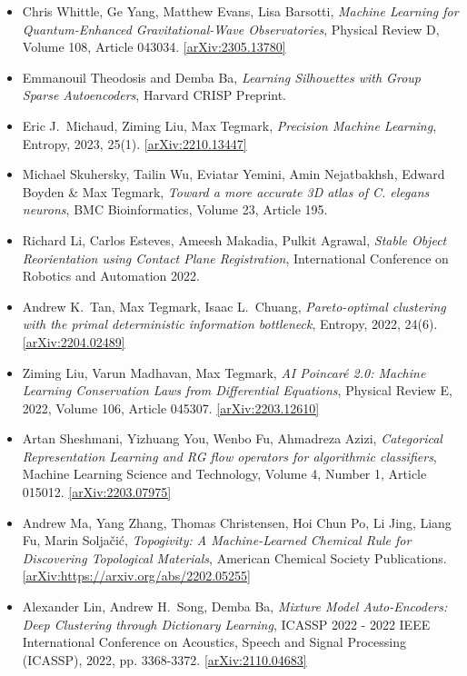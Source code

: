 \begin{itemize}
\item Chris Whittle, Ge Yang, Matthew Evans, Lisa Barsotti, \textit{Machine Learning for Quantum-Enhanced Gravitational-Wave Observatories}, Physical Review D, Volume 108, Article 043034. \href{https://arxiv.org/abs/2305.13780}{[arXiv:2305.13780]} 
\item Emmanouil Theodosis and Demba Ba, \textit{Learning Silhouettes with Group Sparse Autoencoders}, Harvard CRISP Preprint. 
\item Eric J.\  Michaud, Ziming Liu, Max Tegmark, \textit{Precision Machine Learning}, Entropy, 2023, 25(1). \href{https://arxiv.org/abs/2210.13447}{[arXiv:2210.13447]} 
\item Michael Skuhersky, Tailin Wu, Eviatar Yemini, Amin Nejatbakhsh, Edward Boyden & Max Tegmark, \textit{Toward a more accurate 3D atlas of C. elegans neurons}, BMC Bioinformatics, Volume 23, Article 195. 
\item Richard Li, Carlos Esteves, Ameesh Makadia, Pulkit Agrawal, \textit{Stable Object Reorientation using Contact Plane Registration}, International Conference on Robotics and Automation 2022. 
\item Andrew K.\  Tan, Max Tegmark, Isaac L.\  Chuang, \textit{Pareto-optimal clustering with the primal deterministic information bottleneck}, Entropy, 2022, 24(6). \href{https://arxiv.org/abs/2204.02489}{[arXiv:2204.02489]} 
\item Ziming Liu, Varun Madhavan, Max Tegmark, \textit{AI Poincaré 2.0: Machine Learning Conservation Laws from Differential Equations}, Physical Review E, 2022, Volume 106, Article 045307. \href{https://arxiv.org/abs/2203.12610}{[arXiv:2203.12610]} 
\item Artan Sheshmani, Yizhuang You, Wenbo Fu, Ahmadreza Azizi, \textit{Categorical Representation Learning and RG flow operators for algorithmic classifiers}, Machine Learning Science and Technology, Volume 4, Number 1, Article 015012. \href{https://arxiv.org/abs/2203.07975}{[arXiv:2203.07975]} 
\item Andrew Ma, Yang Zhang, Thomas Christensen, Hoi Chun Po, Li Jing, Liang Fu, Marin Soljačić, \textit{Topogivity: A Machine-Learned Chemical Rule for Discovering Topological Materials}, American Chemical Society Publications. \href{https://arxiv.org/abs/https://arxiv.org/abs/2202.05255}{[arXiv:https://arxiv.org/abs/2202.05255]} 
\item Alexander Lin, Andrew H.\  Song, Demba Ba, \textit{Mixture Model Auto-Encoders: Deep Clustering through Dictionary Learning}, ICASSP 2022 - 2022 IEEE International Conference on Acoustics, Speech and Signal Processing (ICASSP), 2022, pp. 3368-3372. \href{https://arxiv.org/abs/2110.04683}{[arXiv:2110.04683]} 

\end{itemize}
